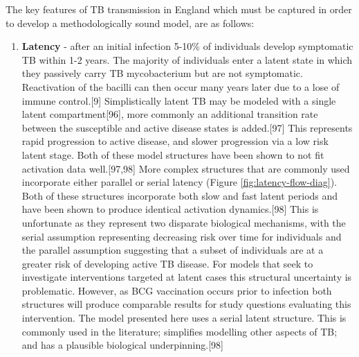 \documentclass[11pt,twoside]{bristolthesis}
\providecommand{\tightlist}{%
  \setlength{\itemsep}{0pt}\setlength{\parskip}{0pt}}
\begin{document}
  The key features of TB transmission in England which must be captured in order to develop a methodologically sound model, are as follows:
  \begin{enumerate}
  \def\labelenumi{\arabic{enumi}.}
  \tightlist
  \item
    \textbf{Latency} - after an initial infection 5-10\% of individuals develop symptomatic TB within 1-2 years. The majority of individuals enter a latent state in which they passively carry TB mycobacterium but are not symptomatic. Reactivation of the bacilli can then occur many years later due to a lose of immune control.{[}9{]} Simplistically latent TB may be modeled with a single latent compartment{[}96{]}, more commonly an additional transition rate between the susceptible and active disease states is added.{[}97{]} This represents rapid progression to active disease, and slower progression via a low risk latent stage. Both of these model structures have been shown to not fit activation data well.{[}97,98{]} More complex structures that are commonly used incorporate either parallel or serial latency (Figure \ref{fig:latency-flow-diag}). Both of these structures incorporate both slow and fast latent periods and have been shown to produce identical activation dynamics.{[}98{]} This is unfortunate as they represent two disparate biological mechanisms, with the serial assumption representing decreasing risk over time for individuals and the parallel assumption suggesting that a subset of individuals are at a greater risk of developing active TB disease. For models that seek to investigate interventions targeted at latent cases this structural uncertainty is problematic. However, as BCG vaccination occurs prior to infection both structures will produce comparable results for study questions evaluating this intervention. The model presented here uses a serial latent structure. This is commonly used in the literature; simplifies modelling other aspects of TB; and has a plausible biological underpinning.{[}98{]}
  \end{enumerate}
\end{document}
